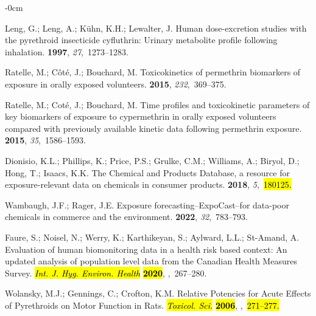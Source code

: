 \documentclass[toxics,article,accept,pdftex,moreauthors]{Definitions/mdpi}
\begin{document}
\begin{adjustwidth}{-\extralength}{0cm}
\begin{thebibliography}{999}
Leng, G.; Leng, A.; K{\"u}hn, K.H.; Lewalter, J.
\newblock Human dose-excretion studies with the pyrethroid insecticide
  cyfluthrin: Urinary metabolite profile following inhalation.
 {\bf 1997}, {\em 27},~1273--1283.

Ratelle, M.; C{\^o}t{\'e}, J.; Bouchard, M.
\newblock Toxicokinetics of permethrin biomarkers of exposure in orally exposed
  volunteers.
 {\bf 2015}, {\em 232},~369--375.

Ratelle, M.; Cot{\'e}, J.; Bouchard, M.
\newblock Time profiles and toxicokinetic parameters of key biomarkers of
  exposure to cypermethrin in orally exposed volunteers compared with
  previously available kinetic data following permethrin exposure.
 {\bf 2015}, {\em 35},~1586--1593.

Dionisio, K.L.; Phillips, K.; Price, P.S.; Grulke, C.M.; Williams, A.; Biryol,
  D.; Hong, T.; Isaacs, K.K.
\newblock The Chemical and Products Database, a resource for exposure-relevant
  data on chemicals in consumer products.
 {\bf 2018}, {\em 5},~\hl{180125.} %


Wambaugh, J.F.; Rager, J.E.
\newblock Exposure forecasting--ExpoCast--for data-poor chemicals in commerce
  and the environment.
 {\bf
  2022}, {\em 32},~783--793.

Faure, S.; Noisel, N.; Werry, K.; Karthikeyan, S.; Aylward, L.L.; St-Amand, A.
\newblock Evaluation of human biomonitoring data in a health risk based
  context: An updated analysis of population level data from the Canadian
  Health Measures Survey.  \emph{\hl{Int. J. Hyg. Environ. Health} %
}  \textbf{\hl{2020}},
,~267--280.

Wolansky, M.J.; Gennings, C.; Crofton, K.M.
\newblock Relative Potencies for Acute Effects of Pyrethroids on Motor Function
  in Rats. \emph{\hl{Toxicol. Sci.} %
} \textbf{\hl{2006}},
,~\hl{271--277.} %



\end{thebibliography}
\end{adjustwidth}
\end{document}
